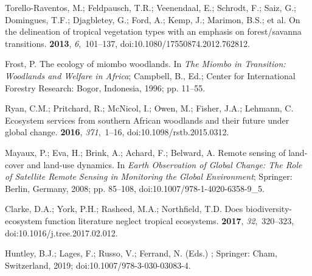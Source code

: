 \documentclass[diversity,article,accept,moreauthors,pdftex]{Definitions/mdpi}
\begin{document}
\begin{thebibliography}{999}
Torello-Raventos, M.; Feldpausch, T.R.; Veenendaal, E.; Schrodt, F.; Saiz, G.;
  Domingues, T.F.; Djagbletey, G.; Ford, A.; Kemp, J.; Marimon, B.S.;
  et al.
\newblock On the delineation of tropical vegetation types with an emphasis on
  forest/savanna transitions.
 {\bf 2013}, {\em 6},~101--137, doi:10.1080/17550874.2012.762812.

Frost, P.
\newblock The ecology of miombo woodlands. In {\em The Miombo in Transition:
  Woodlands and Welfare in Africa}; Campbell, B., Ed.; Center for International
  Forestry Research: Bogor, Indonesia,  1996; pp. 11--55.

Ryan, C.M.; Pritchard, R.; McNicol, I.; Owen, M.; Fisher, J.A.; Lehmann, C.
\newblock Ecosystem services from southern {African} woodlands and their future
  under global change.
 {\bf 2016}, {\em 371},~1--16, doi:10.1098/rstb.2015.0312.

Mayaux, P.; Eva, H.; Brink, A.; Achard, F.; Belward, A.
\newblock Remote sensing of land-cover and land-use dynamics. In {\em Earth
  Observation of Global Change: The Role of Satellite Remote Sensing in
  Monitoring the Global Environment}; Springer: Berlin, Germany,  2008;
  pp. 85--108, doi:10.1007/978-1-4020-6358-9\_5.

Clarke, D.A.; York, P.H.; Rasheed, M.A.; Northfield, T.D.
\newblock Does biodiversity-ecosystem function literature neglect tropical
  ecosystems.
 {\bf 2017}, {\em 32},~320--323, doi:10.1016/j.tree.2017.02.012.

Huntley, B.J.; Lages, F.; Russo, V.; Ferrand, N. (Eds.)
; Springer: Cham, Switzerland,  2019; doi:10.1007/978-3-030-03083-4.


\end{thebibliography}
\end{document}
